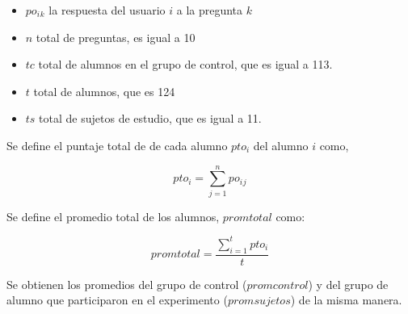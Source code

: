 \begin{itemize}
    \item $po_i{_k}$ la respuesta del usuario $i$ a la pregunta $k$
    \item $n$ total de preguntas, es igual a 10
    \item $tc$ total de alumnos en el grupo de control, que es igual a 113.
    \item $t$ total de alumnos, que es 124
    \item $ts$ total de sujetos de estudio, que es igual a 11.
\end{itemize}

Se define el puntaje total de de cada alumno $pto_i$ del alumno $i$ como, 

\begin{equation*}
    pto_i = \sum_{j=1}^n{po_i{_j}}
\end{equation*}

Se define el promedio total de los alumnos, $promtotal$ como:

\begin{equation*}
    promtotal = \frac{\sum_{i=1}^t{pto_i}}{t}
\end{equation*}

Se obtienen los promedios del grupo de control ($promcontrol$) y del grupo de alumno que
participaron en el experimento ($promsujetos$) de la misma manera.
